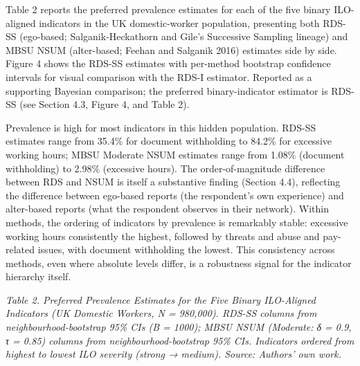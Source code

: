 \documentclass[
  12pt,
  letterpaper,
  DIV=11,
  numbers=noendperiod]{scrartcl}
\begin{document}
Table 2 reports the preferred prevalence estimates for each of the five
binary ILO-aligned indicators in the UK domestic-worker population,
presenting both RDS-SS (ego-based; Salganik-Heckathorn and Gile's
Successive Sampling lineage) and MBSU NSUM (alter-based; Feehan and
Salganik 2016) estimates side by side. Figure 4 shows the RDS-SS
estimates with per-method bootstrap confidence intervals for visual
comparison with the RDS-I estimator. Reported as a supporting Bayesian
comparison; the preferred binary-indicator estimator is RDS-SS (see
Section 4.3, Figure 4, and Table 2).

Prevalence is high for most indicators in this hidden population. RDS-SS
estimates range from 35.4\% for document withholding to 84.2\% for
excessive working hours; MBSU Moderate NSUM estimates range from 1.08\%
(document withholding) to 2.98\% (excessive hours). The
order-of-magnitude difference between RDS and NSUM is itself a
substantive finding (Section 4.4), reflecting the difference between
ego-based reports (the respondent's own experience) and alter-based
reports (what the respondent observes in their network). Within methods,
the ordering of indicators by prevalence is remarkably stable: excessive
working hours consistently the highest, followed by threats and abuse
and pay-related issues, with document withholding the lowest. This
consistency across methods, even where absolute levels differ, is a
robustness signal for the indicator hierarchy itself.

\emph{Table 2. Preferred Prevalence Estimates for the Five Binary
ILO-Aligned Indicators (UK Domestic Workers, N = 980,000). RDS-SS
columns from neighbourhood-bootstrap 95\% CIs (B = 1000); MBSU NSUM
(Moderate: δ = 0.9, τ = 0.85) columns from neighbourhood-bootstrap 95\%
CIs. Indicators ordered from highest to lowest ILO severity (strong →
medium). Source: Authors' own work.}
\end{document}
